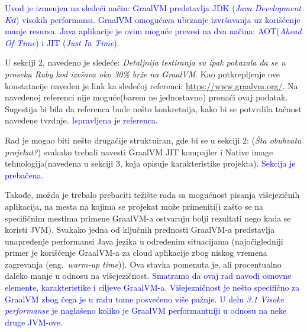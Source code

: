 \documentclass[a4paper]{report}
\newcommand{\odgovor}[1]{\textcolor{blue}{#1}}
\begin{document}
\odgovor{
Uvod je izmenjen na sledeći način:
GraalVM predstavlja JDK (\emph{Java Development Kit}) visokih performansi\cite{graalvm}. GraalVM omogućava ubrzanje izvršavanja uz korišćenje manje resursa. Java aplikacije je ovim moguće prevesi na dva načina: AOT(\emph{Ahead Of Time}) i JIT (\emph{Just In Time}).
}

U sekciji 2, navedeno je sledeće: \textit{Detaljnija testiranja su ipak pokazala da se u proseku Ruby kod izvšava oko 30\% brže na GraalVM}. 
Kao potkrepljenje ove konstatacije naveden je link ka sledećoj referenci: \href{https://www.graalvm.org/}{https://www.graalvm.org/}. Na 
navedenoj referenci nije moguće(barem ne jednostavno) pronaći ovaj podatak. Sugestija bi bila da referenca bude nešto konkretnija, kako bi se 
potvrdila tačnost navedene tvrdnje. 
\odgovor{Ispravljena je referenca.}

Rad je mogao biti nešto drugačije struktuiran, gde bi se u sekciji 2: (\textit{Šta obuhvata projekat?}) svakako trebali navesti GraalVM JIT 
kompajler i Native image tehnologija(navedena u sekciji 3, koja opisuje karakteristike projekta). 
\odgovor{Sekcija je prebačena.}

Takođe, možda je trebalo prebaciti težište rada sa mogućnost pisanja višejezičnih aplikacija, na mesta na kojima se projekat može primeniti(i 
zašto se na specifičnim mestima primene GraalVM-a ostvaruju bolji rezultati nego kada se koristi JVM). Svakako jedna od ključnih prednosti 
GraalVM-a predstavlja unapređenje performansi Java jezika u određenim situacijama (najočigledniji primer je korišćenje GraalVM-a za cloud 
aplikacije zbog niskog vremena zagrevanja (eng.~{\em warm-up time})). Ova stavka pomenuta je, ali procentualno daleko manje u odnosu na 
višejezičnost.
\odgovor{Smatramo da ovaj rad navodi osnovne elemente, karakteristike i ciljeve GraalVM-a. Višejezničnost je nešto specifično za GraalVM zbog čega je u radu tome posvećeno više pažnje. U delu \emph{3.1 Visoke performanse} je naglašeno koliko je GraalVM performantniji u odnosu na neke druge JVM-ove.}
\end{document}

